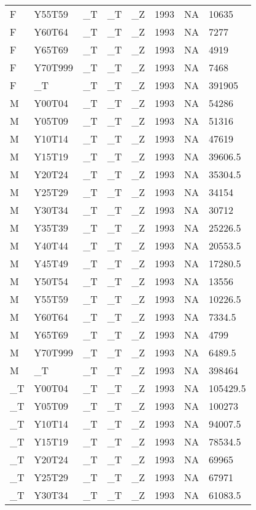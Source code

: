 \begin{longtable}[t]{llllllll}
F & Y55T59 & \_T & \_T & \_Z & 1993 & NA & 10635\\
F & Y60T64 & \_T & \_T & \_Z & 1993 & NA & 7277\\
F & Y65T69 & \_T & \_T & \_Z & 1993 & NA & 4919\\
\addlinespace
F & Y70T999 & \_T & \_T & \_Z & 1993 & NA & 7468\\
F & \_T & \_T & \_T & \_Z & 1993 & NA & 391905\\
M & Y00T04 & \_T & \_T & \_Z & 1993 & NA & 54286\\
M & Y05T09 & \_T & \_T & \_Z & 1993 & NA & 51316\\
M & Y10T14 & \_T & \_T & \_Z & 1993 & NA & 47619\\
\addlinespace
M & Y15T19 & \_T & \_T & \_Z & 1993 & NA & 39606.5\\
M & Y20T24 & \_T & \_T & \_Z & 1993 & NA & 35304.5\\
M & Y25T29 & \_T & \_T & \_Z & 1993 & NA & 34154\\
M & Y30T34 & \_T & \_T & \_Z & 1993 & NA & 30712\\
M & Y35T39 & \_T & \_T & \_Z & 1993 & NA & 25226.5\\
\addlinespace
M & Y40T44 & \_T & \_T & \_Z & 1993 & NA & 20553.5\\
M & Y45T49 & \_T & \_T & \_Z & 1993 & NA & 17280.5\\
M & Y50T54 & \_T & \_T & \_Z & 1993 & NA & 13556\\
M & Y55T59 & \_T & \_T & \_Z & 1993 & NA & 10226.5\\
M & Y60T64 & \_T & \_T & \_Z & 1993 & NA & 7334.5\\
\addlinespace
M & Y65T69 & \_T & \_T & \_Z & 1993 & NA & 4799\\
M & Y70T999 & \_T & \_T & \_Z & 1993 & NA & 6489.5\\
M & \_T & \_T & \_T & \_Z & 1993 & NA & 398464\\
\_T & Y00T04 & \_T & \_T & \_Z & 1993 & NA & 105429.5\\
\_T & Y05T09 & \_T & \_T & \_Z & 1993 & NA & 100273\\
\addlinespace
\_T & Y10T14 & \_T & \_T & \_Z & 1993 & NA & 94007.5\\
\_T & Y15T19 & \_T & \_T & \_Z & 1993 & NA & 78534.5\\
\_T & Y20T24 & \_T & \_T & \_Z & 1993 & NA & 69965\\
\_T & Y25T29 & \_T & \_T & \_Z & 1993 & NA & 67971\\
\_T & Y30T34 & \_T & \_T & \_Z & 1993 & NA & 61083.5\\

\end{longtable}

